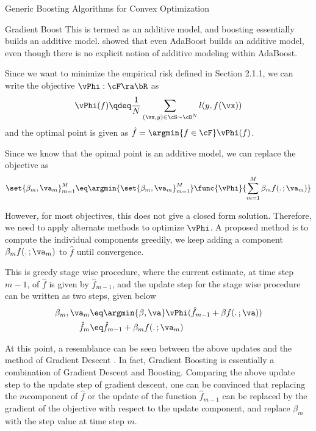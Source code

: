 \documentclass{article}
\begin{document}
\begin{psection}{Generic Boosting Algorithms for Convex Optimization}
\begin{psubsection}{Gradient Boost}
		This is termed as an additive model, and boosting essentially builds an additive model. \cite{additive} showed that even AdaBoost builds an additive model, even though there is no explicit notion of additive modeling within AdaBoost.

		Since we want to minimize the empirical risk defined in Section 2.1.1, we can write the objective $\vPhi : \cF \ra \bR$ as
		\begin{align*}
			\vPhi(f) \qdeq \frac{1}{N} \sum_{(\vx, y) \in \cS \sim \cD^N} l(y, f(\vx))
		\end{align*}
		and the optimal point is given as $\hat{f} = \argmin{f \in \cF} \vPhi(f)$.

		Since we know that the opimal point is an additive model, we can replace the objective as
		\begin{align*}
			\set{\beta_m, \va_m}_{m = 1}^M \eq \argmin{\set{\beta_m, \va_m}_{m = 1}^M} \func{\vPhi}{\sum_{m = 1}^M \beta_m f(.\,;\va_m)}
		\end{align*}

		However, for most objectives, this does not give a closed form solution. Therefore, we need to apply alternate methods to optimize $\vPhi$. A proposed method is to compute the individual components greedily, \ie we keep adding a component $\beta_m f(.\,; \va_m)$ to $\hat{f}$ until convergence.

		This is greedy stage wise procedure, where the current estimate, \ie at time step $m - 1$, of $\hat{f}$ is given by $\hat{f}_{m - 1}$, and the update step for the stage wise procedure can be written as two steps, given below
		\begin{align*}
			\beta_m, \va_m	&\eq	\argmin{\beta, \va} \vPhi(\hat{f}_{m - 1} + \beta f(.\,; \va)) \\
			\hat{f}_m		&\eq	\hat{f}_{m - 1} + \beta_m f(.\,; \va_m)
		\end{align*}

		At this point, a resemblance can be seen between the above updates and the method of Gradient Descent \citep{fgt, gbm}. In fact, Gradient Boosting is essentially a combination of Gradient Descent and Boosting. Comparing the above update step to the update step of gradient descent, one can be convinced that replacing the $m$\tth component of $\hat{f}$ or the update of the function $\hat{f}_{m - 1}$ can be replaced by the gradient of the objective with respect to the update component, and replace $\beta_m$ with the step value at time step $m$.


\end{psubsection}
\end{psection}
\end{document}
